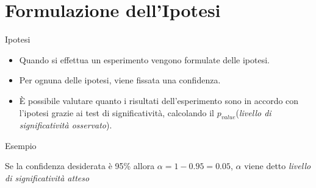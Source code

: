 \documentclass[10pt]{beamer}
\begin{document}
	\section{Formulazione dell'Ipotesi}

	\begin{frame}{Ipotesi}

		\begin{itemize}

			\item Quando si effettua un esperimento vengono formulate delle ipotesi.
			\item Per ognuna delle ipotesi, viene fissata una confidenza.
			\item È possibile valutare quanto i risultati dell'esperimento sono in accordo con l'ipotesi grazie ai test di significatività, calcolando il $p_{value} $(\textit{livello di significatività osservato}).

		\end{itemize}

		\begin{exampleblock}{Esempio}

			Se la confidenza desiderata è 95\%  allora $\alpha = 1 - 0.95 = 0.05$, $\alpha$ viene detto \textit{livello di significatività atteso}

		\end{exampleblock}

	\end{frame}
\end{document}
